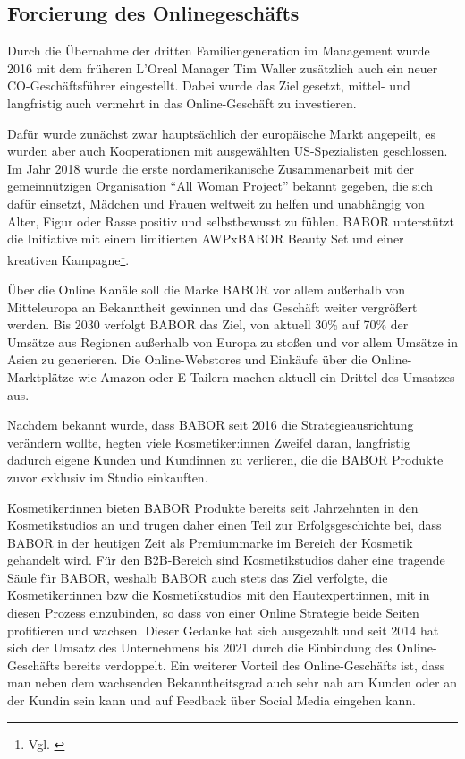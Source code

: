 \subsection{Forcierung des Onlinegeschäfts}\label{unterabschnitt_4_2}
Durch die Übernahme der dritten Familiengeneration im Management wurde 2016 mit dem früheren L'Oreal Manager Tim Waller zusätzlich auch ein neuer CO-Geschäftsführer eingestellt. Dabei wurde das Ziel gesetzt, mittel- und langfristig auch vermehrt in das Online-Geschäft zu investieren.
\newline

Dafür wurde zunächst zwar hauptsächlich der europäische Markt angepeilt, es wurden aber auch Kooperationen mit ausgewählten US-Spezialisten geschlossen. Im Jahr 2018 wurde die erste nordamerikanische Zusammenarbeit mit der gemeinnützigen Organisation “All Woman Project” bekannt gegeben, die sich dafür einsetzt, Mädchen und Frauen weltweit zu helfen und unabhängig von Alter, Figur oder Rasse positiv und selbstbewusst zu fühlen. BABOR unterstützt die Initiative mit einem limitierten AWPxBABOR Beauty Set und einer kreativen Kampagne\footnote{ Vgl. \autocite [online] {Cision2018}}.
\newline

Über die Online Kanäle soll die Marke BABOR vor allem außerhalb von Mitteleuropa an Bekanntheit gewinnen und das Geschäft weiter vergrößert werden. Bis 2030 verfolgt BABOR das Ziel, von aktuell 30\% auf 70\% der Umsätze aus Regionen außerhalb von Europa zu stoßen und vor allem Umsätze in Asien zu generieren. Die Online-Webstores und Einkäufe über die Online-Marktplätze wie Amazon oder E-Tailern machen aktuell ein Drittel des Umsatzes aus.
\newline

Nachdem bekannt wurde, dass BABOR seit 2016 die Strategieausrichtung verändern wollte, hegten viele Kosmetiker:innen Zweifel daran, langfristig dadurch eigene Kunden und Kundinnen zu verlieren, die die BABOR Produkte zuvor exklusiv im Studio einkauften.
\newline

Kosmetiker:innen bieten BABOR Produkte bereits seit Jahrzehnten in den Kosmetikstudios an und trugen daher einen Teil zur Erfolgsgeschichte bei, dass BABOR in der heutigen Zeit als Premiummarke im Bereich der Kosmetik gehandelt wird. Für den B2B-Bereich sind Kosmetikstudios daher eine tragende Säule für BABOR, weshalb BABOR auch stets das Ziel verfolgte, die Kosmetiker:innen bzw die Kosmetikstudios mit den Hautexpert:innen, mit in diesen Prozess einzubinden, so dass von einer Online Strategie beide Seiten profitieren und wachsen. Dieser Gedanke hat sich ausgezahlt und seit 2014 hat sich der Umsatz des Unternehmens bis 2021 durch die Einbindung des Online-Geschäfts bereits verdoppelt.
Ein weiterer Vorteil des Online-Geschäfts ist, dass man neben dem wachsenden  Bekanntheitsgrad auch sehr nah am Kunden oder an der Kundin sein kann und auf Feedback über Social Media eingehen kann.
\newline

